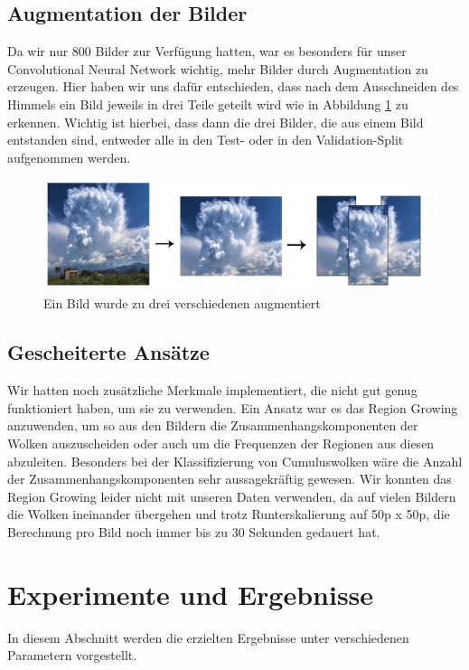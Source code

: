 \documentclass[a4,german]{article}
\begin{document}
\subsection{Augmentation der Bilder}
\label{sec:augmentation}
Da wir nur 800 Bilder zur Verfügung hatten, war es besonders für unser Convolutional Neural Network wichtig, mehr Bilder durch Augmentation zu erzeugen.
Hier haben wir uns dafür entschieden, dass nach dem Ausschneiden des Himmels%
ein Bild jeweils in drei Teile geteilt wird wie in Abbildung \ref{fig:augmentation} zu erkennen.
Wichtig ist hierbei, dass dann die drei Bilder, die aus einem Bild entstanden sind, entweder alle in den Test- oder in den Validation-Split aufgenommen werden.

\begin{figure}[h!]
\centering
\includegraphics[width=\textwidth]{Augmentation}
\caption{Ein Bild wurde zu drei verschiedenen augmentiert}
    \label{fig:augmentation}
\end{figure}

\subsection{Gescheiterte Ansätze}
Wir hatten noch zusätzliche Merkmale implementiert, die nicht gut genug funktioniert haben, um sie zu verwenden.
Ein Ansatz war es das Region Growing anzuwenden, um so aus den Bildern die Zusammenhangskomponenten der Wolken auszuscheiden oder auch um die Frequenzen der Regionen aus diesen abzuleiten.
Besonders bei der Klassifizierung von Cumuluswolken %
wäre die Anzahl der Zusammenhangskomponenten sehr aussagekräftig gewesen.
Wir konnten das Region Growing leider nicht mit unseren Daten verwenden, da auf vielen Bildern die Wolken ineinander übergehen und trotz Runterskalierung auf 50p x 50p, die Berechnung pro Bild noch immer bis zu 30 Sekunden gedauert hat.


\section{Experimente und Ergebnisse}
\label{sec:experimente}
In diesem Abschnitt werden die erzielten Ergebnisse unter verschiedenen Parametern vorgestellt.
\end{document}
